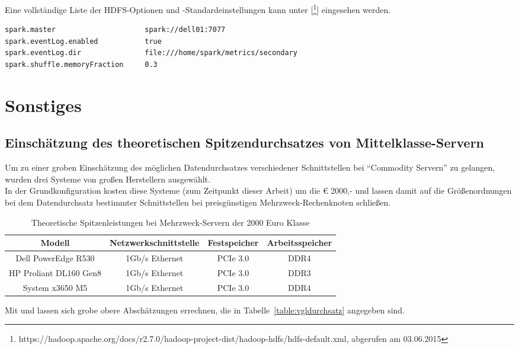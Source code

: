 \begin{appendices}
Eine vollständige Liste der HDFS-Optionen und -Standardeinstellungen kann unter [\footnote{https://hadoop.apache.org/docs/r2.7.0/hadoop-project-dist/hadoop-hdfs/hdfs-default.xml, abgerufen am 03.06.2015}] eingesehen werden.

\begin{lstlisting}[caption={spark-defaults.conf (Auszug)},label={lst:hdfs_config}]
spark.master                     spark://dell01:7077
spark.eventLog.enabled           true
spark.eventLog.dir               file:///home/spark/metrics/secondary
spark.shuffle.memoryFraction     0.3
\end{lstlisting}

\section{Sonstiges}
\subsection{Einschätzung des theoretischen Spitzendurchsatzes von Mittelklasse-Servern}
\label{subsec:commodity_servers}
Um zu einer groben Einschätzung des möglichen Datendurchsatzes verschiedener Schnittstellen bei "`Commodity Servern"' zu gelangen, wurden drei Systeme von großen Herstellern ausgewählt.\\
In der Grundkonfiguration kosten diese Systeme (zum Zeitpunkt dieser Arbeit) um die € 2000,- und lassen damit auf die Größenordnungen bei dem Datendurchsatz bestimmter Schnittstellen bei preisgünstigen Mehrzweck-Rechenknoten schließen.

\begin{table}[ht]
	\centering %
	\begin{tabular}{c c c c} %
		\hline\hline %
		Modell & Netzwerkschnittstelle & Festspeicher & Arbeitsspeicher\\ [0.5ex] %
		\hline %
		Dell PowerEdge R530 & 1Gb/s Ethernet & PCIe 3.0 & DDR4\\ 
		HP Proliant DL160 Gen8 & 1Gb/s Ethernet & PCIe 3.0 & DDR3\\ 
		System x3650 M5 & 1Gb/s Ethernet & PCIe 3.0 & DDR4\\ %
		\hline %
	\end{tabular}
	\caption{Theoretische Spitzenleistungen bei Mehrzweck-Servern der 2000 Euro Klasse} %
	\label{table:vglinterfaces} %
\end{table}

Mit \cite{PCI14} und \cite{Fuj11} lassen sich grobe obere Abschätzungen errechnen, die in Tabelle~\ref{table:vgldurchsatz} angegeben sind.

\end{appendices}